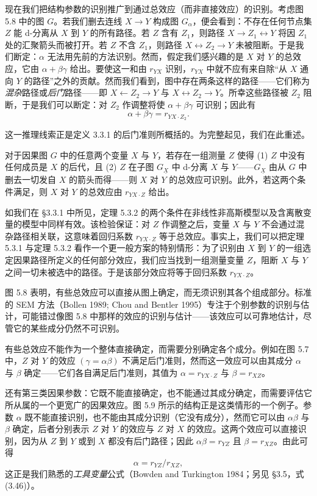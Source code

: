 现在我们把结构参数的识别推广到通过总效应（而非直接效应）的识别。考虑图 5.8 中的图 $G$。若我们删去连线 $X\to Y$ 构成图 $G_\alpha$，便会看到：不存在任何节点集 $Z$ 能 d-分离从 $X$ 到 $Y$ 的所有路径。若 $Z$ 含有 $Z_1$，则路径 $X\to Z_1\longleftrightarrow Y$ 将因 $Z_1$ 处的汇聚箭头而被打开。若 $Z$ 不含 $Z_1$，则路径 $X\longleftrightarrow Z_2\to Y$ 未被阻断。于是我们断定：$\alpha$ 无法用先前的方法识别。然而，假定我们感兴趣的是 $X$ 对 $Y$ 的总效应，它由 $\alpha+\beta\gamma$ 给出。要使这一和由 $r_{YX}$ 识别，$r_{YX}$ 中就不应有来自除“从 $X$ 通向 $Y$ 的路径”之外的贡献。然而我们看到，图中存在两条这样的路径——它们称为\emph{混杂}路径或\emph{后门}路径——即 $X\leftarrow Z_2\to Y$ 与 $X\longleftrightarrow Z_2\to Y$。所幸这些路径被 $Z_2$ 阻断，于是我们可以断定：对 $Z_2$ 作调整将使 $\alpha+\beta\gamma$ 可识别；因此有
\[
\alpha+\beta\gamma=r_{YX\cdot Z_2}.
\]

这一推理线索正是定义 3.3.1 的后门准则所概括的。为完整起见，我们在此重述。

\begin{theorem}[后门准则]
对于因果图 $G$ 中的任意两个变量 $X$ 与 $Y$，若存在一组测量 $Z$ 使得 (1) $Z$ 中没有任何成员是 $X$ 的后代，且 (2) $Z$ 在子图 $G_{\underline{X}}$ 中 d-分离 $X$ 与 $Y$——$G_{\underline{X}}$ 由从 $G$ 中删去一切发自 $X$ 的箭头而得——则 $X$ 对 $Y$ 的总效应可识别。此外，若这两个条件满足，则 $X$ 对 $Y$ 的总效应由 $r_{YX\cdot Z}$ 给出。
\end{theorem}

如我们在 \S 3.3.1 中所见，定理 5.3.2 的两个条件在非线性非高斯模型以及含离散变量的模型中同样有效。该检验保证：对 $Z$ 作调整之后，变量 $X$ 与 $Y$ 不会通过混杂路径相关联，这意味着回归系数 $r_{YX\cdot Z}$ 等于总效应。事实上，我们可以把定理 5.3.1 与定理 5.3.2 看作一个更一般方案的特别情形：为了识别由 $X$ 到 $Y$ 的一组选定因果路径所定义的任何部分效应，我们应当找到一组测量变量 $Z$，阻断 $X$ 与 $Y$ 之间一切未被选中的路径。于是该部分效应将等于回归系数 $r_{YX\cdot Z}$。

图 5.8 表明，有些总效应可以直接从图上确定，而无须识别其各个组成部分。标准的 SEM 方法（Bollen 1989; Chou and Bentler 1995）专注于个别参数的识别与估计，可能错过像图 5.8 中那样的效应的识别与估计——该效应可以可靠地估计，尽管它的某些成分仍然不可识别。

有些总效应不能作为一个整体直接确定，而需要分别确定各个成分。例如在图 5.7 中，$Z$ 对 $Y$ 的效应 $(\gamma=\alpha\beta)$ 不满足后门准则，然而这一效应可以由其成分 $\alpha$ 与 $\beta$ 确定——它们各自满足后门准则，其值为 $\alpha=r_{YX\cdot Z}$ 与 $\beta=r_{XZ}$。

还有第三类因果参数：它既不能直接确定，也不能通过其成分确定，而需要评估它所从属的一个更宽广的因果效应。图 5.9 所示的结构正是这类情形的一个例子。参数 $\alpha$ 既不能直接识别，也不能由其成分识别（它没有成分），然而它可以由 $\alpha\beta$ 与 $\beta$ 确定，后者分别表示 $Z$ 对 $Y$ 的效应与 $Z$ 对 $X$ 的效应。这两个效应可以直接识别，因为从 $Z$ 到 $Y$ 或到 $X$ 都没有后门路径；因此 $\alpha\beta=r_{YZ}$ 且 $\beta=r_{XZ}$。由此可得
\[
\alpha=r_{YZ}/r_{XZ},
\]
这正是我们熟悉的\emph{工具变量}公式（Bowden and Turkington 1984；另见 \S 3.5，式 \textup{(3.46)}）。

